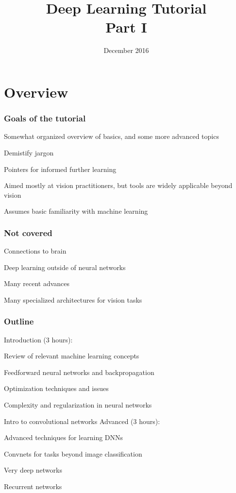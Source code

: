 \documentclass[xcolor=dvipsnames]{beamer}
\title{Deep Learning Tutorial\\Part I}
\institute{%
  \vspace{-1em}\begin{minipage}[t]{.25\linewidth}%
    \vspace{-3em}%
    \texttt{[image: tticlogo]}\vspace{2em}%
  \end{minipage}%
  \begin{minipage}[t]{.5\linewidth}%
    {\Large Greg Shakhnarovich}\\{\Large TTI-Chicago\vspace{2em}}%
  \end{minipage}%
}
\date{December 2016}
\begin{document}
\maketitle

\section{Overview}

\begin{frame}
  \frametitle{Goals of the tutorial}
\bi
\item Somewhat organized overview of basics, and some more advanced
  topics
\item Demistify jargon
\item Pointers for informed further learning
\item Aimed mostly at vision practitioners, but tools are widely
  applicable beyond vision
\item Assumes basic familiarity with machine learning
\ei  
\end{frame}

\begin{frame}
  \frametitle{Not covered}
  \bi
\item Connections to brain
\item Deep learning outside of neural networks
\item Many recent advances
\item Many specialized architectures for vision tasks
\ei
\end{frame}


\begin{frame}
  \frametitle{Outline}
Introduction (3 hours):
\bi
\item Review of relevant machine learning concepts
\item Feedforward neural networks and backpropagation
\item Optimization techniques and issues
\item Complexity and regularization in neural networks
\item Intro to convolutional networks
\ei
Advanced (3 hours):
\bi
\item Advanced techniques for learning DNNs
\item Convnets for tasks beyond image classification
\item Very deep networks
\item Recurrent networks
\ei
\end{frame}
\end{document}
